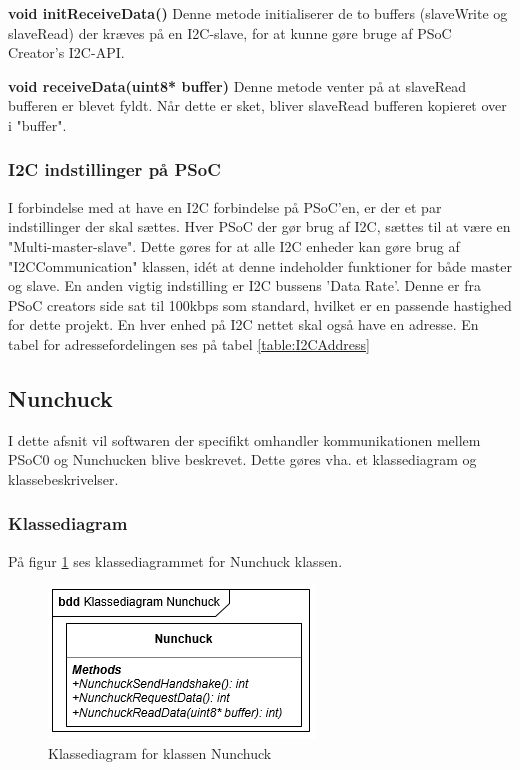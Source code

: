 \noindent\textbf{void initReceiveData()} \newline 
Denne metode initialiserer de to buffers (slaveWrite og slaveRead) der kræves på en I2C-slave, for at kunne gøre bruge af PSoC Creator's I2C-API. \newline

\noindent\textbf{void receiveData(uint8* buffer)}\newline
Denne metode venter på at slaveRead bufferen er blevet fyldt. Når dette er sket, bliver slaveRead bufferen kopieret over i "buffer".

\subsubsection{I2C indstillinger på PSoC}
I forbindelse med at have en I2C forbindelse på PSoC'en, er der et par indstillinger der skal sættes. Hver PSoC der gør brug af I2C, sættes til at være en "Multi-master-slave". Dette gøres for at alle I2C enheder kan gøre brug af "I2CCommunication" klassen, idét at denne indeholder funktioner for både master og slave. 
En anden vigtig indstilling er I2C bussens 'Data Rate'. Denne er fra PSoC creators side sat til 100kbps som standard, hvilket er en passende hastighed for dette projekt.
En hver enhed på I2C nettet skal også have en adresse. En tabel for adressefordelingen ses på tabel \ref{table:I2CAddress}


\subsection{Nunchuck}
I dette afsnit vil softwaren der specifikt omhandler kommunikationen mellem PSoC0 og Nunchucken blive beskrevet. Dette gøres vha. et klassediagram og klassebeskrivelser.

\subsubsection{Klassediagram}
På figur \ref{figure:NunchuckKlassediagram} ses klassediagrammet for Nunchuck klassen.

\begin{figure}[H]
	\centering
	\includegraphics[]{DesignOgImplementering/images/nunchuck}
	\caption{Klassediagram for klassen Nunchuck}
	\label{figure:NunchuckKlassediagram}
\end{figure}

